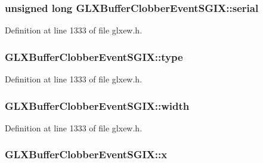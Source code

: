 \subsubsection[{serial}]{\setlength{\rightskip}{0pt plus 5cm}unsigned long G\+L\+X\+Buffer\+Clobber\+Event\+S\+G\+I\+X\+::serial}\label{struct_g_l_x_buffer_clobber_event_s_g_i_x_ac295e3276a7986eeae4d6a2a28c7e0b7}


Definition at line 1333 of file glxew.\+h.

\hypertarget{struct_g_l_x_buffer_clobber_event_s_g_i_x_a36e3e8a5feea664623ea43d0f273b63a}{}
\subsubsection[{type}]{ G\+L\+X\+Buffer\+Clobber\+Event\+S\+G\+I\+X\+::type}\label{struct_g_l_x_buffer_clobber_event_s_g_i_x_a36e3e8a5feea664623ea43d0f273b63a}


Definition at line 1333 of file glxew.\+h.

\hypertarget{struct_g_l_x_buffer_clobber_event_s_g_i_x_adad23535733161528427584a42bfc6eb}{}
\subsubsection[{width}]{ G\+L\+X\+Buffer\+Clobber\+Event\+S\+G\+I\+X\+::width}\label{struct_g_l_x_buffer_clobber_event_s_g_i_x_adad23535733161528427584a42bfc6eb}


Definition at line 1333 of file glxew.\+h.

\hypertarget{struct_g_l_x_buffer_clobber_event_s_g_i_x_a5118d48c3c8d5253d39922b5014b52ff}{}
\subsubsection[{x}]{ G\+L\+X\+Buffer\+Clobber\+Event\+S\+G\+I\+X\+::x}\label{struct_g_l_x_buffer_clobber_event_s_g_i_x_a5118d48c3c8d5253d39922b5014b52ff}


